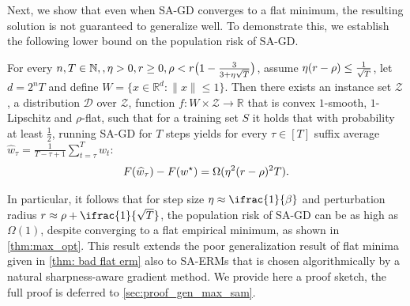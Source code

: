 Next, we show that even when SA-GD converges to a flat minimum, the resulting solution is not guaranteed to generalize well. To demonstrate this, we establish the following lower bound on the population risk of SA-GD.
\begin{theorem}\label{thm: gen max sam}
    For every $n,T\in \mathbb{N},,\eta > 0, r \geq 0, \rho < r \bigl(1 - \frac{3}{3 + \eta \sqrt{T}}\bigr)$, assume $\eta (r - \rho) \leq \frac{1}{\sqrt{T}}$, let $d = 2^n T$ and define $W = \{x \in \mathbb{R}^d: \|x\| \leq 1\}$. Then there exists an instance set $\mathcal{Z}$, a distribution $\mathcal{D}$ over $\mathcal{Z}$, function $f: W \times \mathcal{Z} \to \mathbb{R}$ that is convex $1$-smooth, $1$-Lipschitz and $\rho$-flat, such that for a training set $S$ it holds that with probability at least $\frac{1}{2}$, running SA-GD for $T$ steps yields for every $\tau \in [T]$ suffix average $\widehat{w}_{\tau} = \frac{1}{T-\tau +1} \sum_{t=\tau}^T w_t$:
    $$F(\widehat{w}_{\tau}) - F(w^{\star}) = \Omega(\eta^2 (r - \rho)^2 T).$$
\end{theorem}

In particular, it follows that for step size $\eta \approx \ifrac{1}{\beta}$ and perturbation radius $\rad \approx \rho + \ifrac{1}{\sqrt{T}}$, the population risk of SA-GD can be as high as $\Omega(1)$, despite converging to a flat empirical minimum, as shown in \cref{thm:max_opt}.
This result extends the poor generalization result of flat minima given in \cref{thm: bad flat erm} also to SA-ERMs that is chosen algorithmically by a natural sharpness-aware gradient method. We provide here a proof sketch, the full proof is deferred to \cref{sec:proof_gen_max_sam}.



